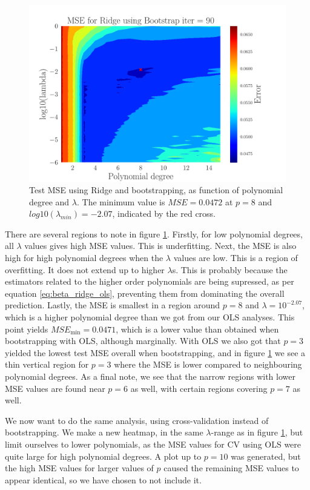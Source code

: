 \documentclass[reprint,english,notitlepage,aps,nobalancelastpage,nofootinbib]{revtex4-1}  %
\begin{document}
\begin{figure}[h]
	\begin{center}
		\includegraphics[width=0.8\linewidth]{Contour_PL_Ridge_Bootstrap90_n30_eps0.2_p1_15_lmb0_m6.pdf}
	\end{center}
	\caption{Test MSE using Ridge and bootstrapping, as function of polynomial degree and $\lambda$. The minimum value is $MSE=0.0472$ at $p=8$ and $log10(\lambda_{min}) = -2.07$, indicated by the red cross.}
	\label{fig:Ridge-boot_heatmap}
\end{figure}

There are several regions to note in figure \ref{fig:Ridge-boot_heatmap}. Firstly, for low polynomial degrees, all $\lambda$ values gives high MSE values. This is underfitting. Next, the MSE is also high for high polynomial degrees when the $\lambda$ values are low. This is a region of overfitting. It does not extend up to higher $\lambda$s. This is probably because the estimators related to the higher order polynomials are being supressed, as per equation \eqref{eq:beta_ridge_ols}, preventing them from dominating the overall prediction. Lastly, the MSE is smallest in a region around $p=8$ and $\lambda=10^{-2.07}$, which is a higher polynomial degree than we got from our OLS analyses. This point yields $MSE_\text{min}=0.0471$, which is a lower value than obtained when bootstrapping with OLS, although marginally. With OLS we also got that $p=3$ yielded the lowest test MSE overall when bootstrapping, and in figure \ref{fig:Ridge-boot_heatmap} we see a thin vertical region for $p=3$ where the MSE is lower compared to neighbouring polynomial degrees. As a final note, we see that the narrow regions with lower MSE values are found near $p=6$ as well, with certain regions covering $p=7$ as well.

We now want to do the same analysis, using cross-validation instead of bootstrapping. We make a new heatmap, in the same $\lambda$-range as in figure \ref{fig:Ridge-boot_heatmap}, but limit ourselves to lower polynomials, as the MSE values for CV using OLS were quite large for high polynomial degrees. A plot up to $p=10$ was generated, but the high MSE values for larger values of $p$ caused the remaining MSE values to appear identical, so we have chosen to not include it.
\end{document}
